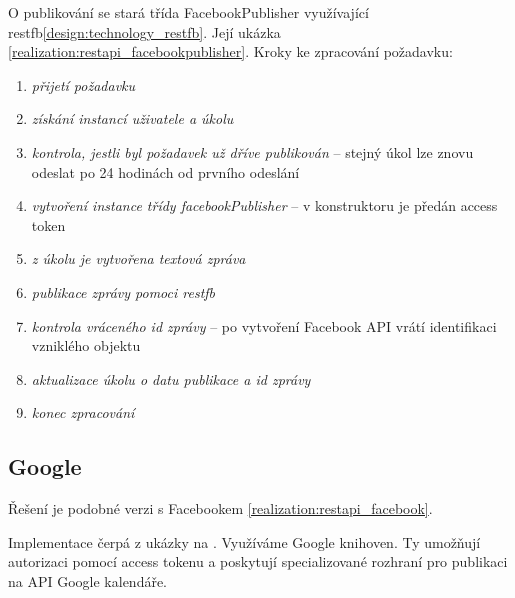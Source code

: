 \documentclass[thesis=B,czech]{FITthesis}[2012/06/26]
\begin{document}
O publikování se stará třída FacebookPublisher využívající restfb\ref{design:technology_restfb}. Její ukázka \ref{realization:restapi_facebookpublisher}.
\vspace*{1\baselineskip}
\newline
Kroky ke zpracování požadavku:
\begin{enumerate}[nosep]
	\item \textit{přijetí požadavku}
	\item \textit{získání instancí uživatele a úkolu} 
	\item \textit{kontrola, jestli byl požadavek už dříve publikován} -- stejný úkol lze znovu odeslat po 24 hodinách od prvního odeslání	
	\item \textit{vytvoření instance třídy facebookPublisher} -- v konstruktoru je předán access token
	\item \textit{z úkolu je vytvořena textová zpráva} 
	\item \textit{publikace zprávy pomoci restfb} 
	\item \textit{kontrola vráceného id zprávy} -- po vytvoření Facebook API vrátí identifikaci vzniklého objektu
	\item \textit{aktualizace úkolu o datu publikace a id zprávy}
	\item \textit{konec zpracování}
\end{enumerate}



\subsection{Google}

Řešení je podobné verzi s Facebookem \ref{realization:restapi_facebook}.

Implementace čerpá z ukázky na \cite{design_google_quickstart}. Využíváme Google knihoven. Ty umožňují autorizaci pomocí access tokenu a poskytují specializované rozhraní pro publikaci na API Google kalendáře.
\end{document}
